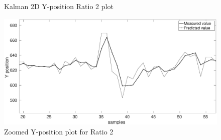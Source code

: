\documentclass[12pt]{article}
\begin{document}
\begin{figure}[h]
\begin{minipage}{0.5\textwidth}
	\caption{Kalman 2D Y-position Ratio 2 plot }
	\label{fig:kalman 2D YRat2}
\end{minipage}%
\begin{minipage}{0.5\textwidth}
\centering
	\includegraphics[width = \textwidth]{./Figures/part2Ratio2Yzoomed.eps}
	\caption{ Zoomed Y-position plot for Ratio 2}
	\label{fig: kalman 2D YRat2 zoom}
\end{minipage}
\end{figure}
\end{document}
